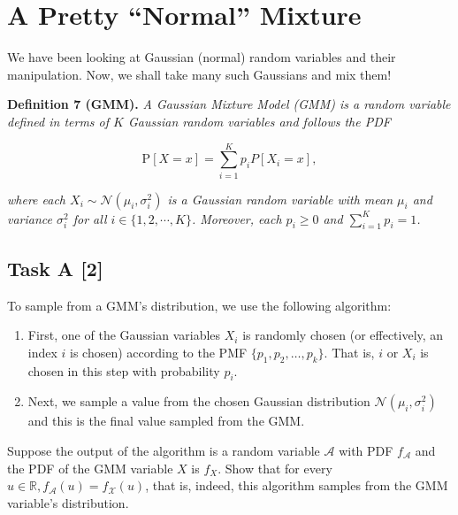 \chapter{A Pretty \enquote{Normal} Mixture}

\begin{tcolorbox}[title=]
    We have been looking at Gaussian (normal) random variables and their
    manipulation. Now, we shall take many such Gaussians and mix them!

    \vspace{10pt}
    \begin{mdframed}[backgroundcolor=lightblue, linecolor=blue, linewidth=1.5pt]
        \textbf{Definition 7 (GMM).}
        \textit{A Gaussian Mixture Model (GMM) is a random variable defined in
        terms of $K$ Gaussian random variables and follows the PDF}
        
        \begin{equation*}
            \text{P}[X = x] = \sum_{i = 1}^K p_i P[X_i = x],
        \end{equation*}

        \textit{where each $X_i \sim \mathcal{N}(\mu_i, \sigma_i^2)$ is a Gaussian
        random variable with mean $\mu_i$ and variance $\sigma_i^2$ for all $i
        \in \{1, 2, \cdots, K\}$. Moreover, each $p_i \ge 0$ and $\sum_{i = 1}^K
        p_i = 1$.}
    \end{mdframed}
\end{tcolorbox}

\section*{\colS{$\S$} Task A \hfill \normalfont \large [2]}

\begin{tcolorbox}
    To sample from a GMM's distribution, we use the following algorithm:

    \vspace{10pt}
    \begin{enumerate}
        \item First, one of the Gaussian variables $X_i$ is randomly chosen (or
        effectively, an index $i$ is chosen) according to the PMF
        $\{p_1, p_2, \ldots, p_k\}$. That is, $i$ or $X_i$ is chosen in this step
        with probability $p_i$.
        \item Next, we sample a value from the chosen Gaussian distribution
        $\mathcal{N}(\mu_i, \sigma_i^2)$ and this is the final value sampled from
        the GMM.
    \end{enumerate}

    Suppose the output of the algorithm is a random variable $\mathcal{A}$ with
    PDF $f_{\mathcal{A}}$ and the PDF of the GMM variable $X$ is $f_X$. Show that
    for every $u \in \mathbb{R}, f_\mathcal{A}(u) = f_\mathcal{X}(u)$, that is,
    indeed, this algorithm samples from the GMM variable's distribution.
\end{tcolorbox}

